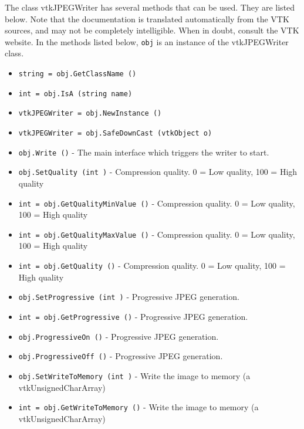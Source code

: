 The class vtkJPEGWriter has several methods that can be used.
  They are listed below.
Note that the documentation is translated automatically from the VTK sources,
and may not be completely intelligible.  When in doubt, consult the VTK website.
In the methods listed below, \verb|obj| is an instance of the vtkJPEGWriter class.
\begin{itemize}
\item  \verb|string = obj.GetClassName ()|

\item  \verb|int = obj.IsA (string name)|

\item  \verb|vtkJPEGWriter = obj.NewInstance ()|

\item  \verb|vtkJPEGWriter = obj.SafeDownCast (vtkObject o)|

\item  \verb|obj.Write ()| -  The main interface which triggers the writer to start.

\item  \verb|obj.SetQuality (int )| -  Compression quality. 0 = Low quality, 100 = High quality

\item  \verb|int = obj.GetQualityMinValue ()| -  Compression quality. 0 = Low quality, 100 = High quality

\item  \verb|int = obj.GetQualityMaxValue ()| -  Compression quality. 0 = Low quality, 100 = High quality

\item  \verb|int = obj.GetQuality ()| -  Compression quality. 0 = Low quality, 100 = High quality

\item  \verb|obj.SetProgressive (int )| -  Progressive JPEG generation.

\item  \verb|int = obj.GetProgressive ()| -  Progressive JPEG generation.

\item  \verb|obj.ProgressiveOn ()| -  Progressive JPEG generation.

\item  \verb|obj.ProgressiveOff ()| -  Progressive JPEG generation.

\item  \verb|obj.SetWriteToMemory (int )| -  Write the image to memory (a vtkUnsignedCharArray)

\item  \verb|int = obj.GetWriteToMemory ()| -  Write the image to memory (a vtkUnsignedCharArray)


\end{itemize}
